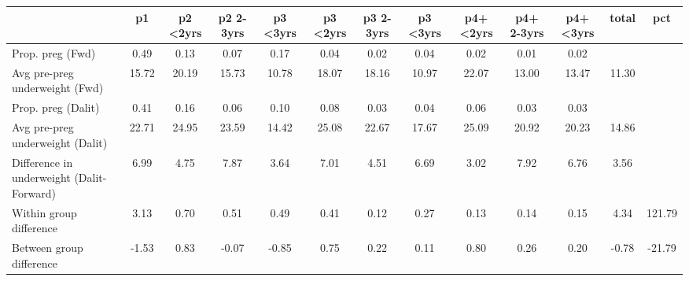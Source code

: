 \begin{tabular}{l*{12}{c}}
\toprule
            &\multicolumn{1}{c}{p1}&\multicolumn{1}{c}{p2 \textless2yrs}&\multicolumn{1}{c}{p2 2-3yrs}&\multicolumn{1}{c}{p3 \textless3yrs}&\multicolumn{1}{c}{p3 \textless2yrs}&\multicolumn{1}{c}{p3 2-3yrs}&\multicolumn{1}{c}{p3 \textless3yrs}&\multicolumn{1}{c}{p4+ \textless2yrs}&\multicolumn{1}{c}{p4+ 2-3yrs}&\multicolumn{1}{c}{p4+ \textless3yrs}&\multicolumn{1}{c}{total}&\multicolumn{1}{c}{pct}\\
\midrule
\midrule
Prop. preg (Fwd)&        0.49&        0.13&        0.07&        0.17&        0.04&        0.02&        0.04&        0.02&        0.01&        0.02&            &            \\
Avg pre-preg underweight (Fwd)&       15.72&       20.19&       15.73&       10.78&       18.07&       18.16&       10.97&       22.07&       13.00&       13.47&       11.30&            \\
Prop. preg (Dalit)&        0.41&        0.16&        0.06&        0.10&        0.08&        0.03&        0.04&        0.06&        0.03&        0.03&            &            \\
Avg pre-preg underweight (Dalit)&       22.71&       24.95&       23.59&       14.42&       25.08&       22.67&       17.67&       25.09&       20.92&       20.23&       14.86&            \\
Difference in underweight (Dalit-Forward)&        6.99&        4.75&        7.87&        3.64&        7.01&        4.51&        6.69&        3.02&        7.92&        6.76&        3.56&            \\
Within group difference&        3.13&        0.70&        0.51&        0.49&        0.41&        0.12&        0.27&        0.13&        0.14&        0.15&        4.34&      121.79\\
Between group difference&       -1.53&        0.83&       -0.07&       -0.85&        0.75&        0.22&        0.11&        0.80&        0.26&        0.20&       -0.78&      -21.79\\
\bottomrule
\end{tabular}
